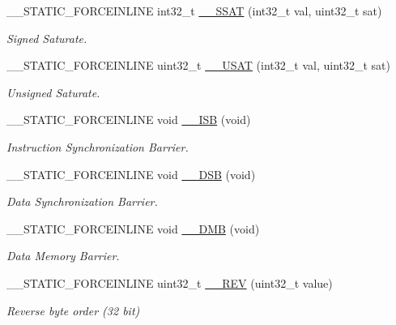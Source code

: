 \begin{DoxyCompactItemize}
\+\_\+\+\_\+\+S\+T\+A\+T\+I\+C\+\_\+\+F\+O\+R\+C\+E\+I\+N\+L\+I\+NE int32\+\_\+t \hyperlink{group___c_m_s_i_s___core___instruction_interface_ga372c0535573dde3e37f0f08c774a3487}{\+\_\+\+\_\+\+S\+S\+AT} (int32\+\_\+t val, uint32\+\_\+t sat)
\begin{DoxyCompactList}\small\item\em Signed Saturate. \end{DoxyCompactList}\item 
\+\_\+\+\_\+\+S\+T\+A\+T\+I\+C\+\_\+\+F\+O\+R\+C\+E\+I\+N\+L\+I\+NE uint32\+\_\+t \hyperlink{group___c_m_s_i_s___core___instruction_interface_ga6562dbd8182d1571e22dbca7ebdfa9bc}{\+\_\+\+\_\+\+U\+S\+AT} (int32\+\_\+t val, uint32\+\_\+t sat)
\begin{DoxyCompactList}\small\item\em Unsigned Saturate. \end{DoxyCompactList}\item 
\+\_\+\+\_\+\+S\+T\+A\+T\+I\+C\+\_\+\+F\+O\+R\+C\+E\+I\+N\+L\+I\+NE void \hyperlink{group___c_m_s_i_s___core___instruction_interface_gae26c2b3961e702aeabc24d4984ebd369}{\+\_\+\+\_\+\+I\+SB} (void)
\begin{DoxyCompactList}\small\item\em Instruction Synchronization Barrier. \end{DoxyCompactList}\item 
\+\_\+\+\_\+\+S\+T\+A\+T\+I\+C\+\_\+\+F\+O\+R\+C\+E\+I\+N\+L\+I\+NE void \hyperlink{group___c_m_s_i_s___core___instruction_interface_ga7fe277f5385d23b9c44b2cbda1577ce9}{\+\_\+\+\_\+\+D\+SB} (void)
\begin{DoxyCompactList}\small\item\em Data Synchronization Barrier. \end{DoxyCompactList}\item 
\+\_\+\+\_\+\+S\+T\+A\+T\+I\+C\+\_\+\+F\+O\+R\+C\+E\+I\+N\+L\+I\+NE void \hyperlink{group___c_m_s_i_s___core___instruction_interface_gab1ea24daaaaee9c828f90cbca330cb5e}{\+\_\+\+\_\+\+D\+MB} (void)
\begin{DoxyCompactList}\small\item\em Data Memory Barrier. \end{DoxyCompactList}\item 
\+\_\+\+\_\+\+S\+T\+A\+T\+I\+C\+\_\+\+F\+O\+R\+C\+E\+I\+N\+L\+I\+NE uint32\+\_\+t \hyperlink{group___c_m_s_i_s___core___instruction_interface_gadb92679719950635fba8b1b954072695}{\+\_\+\+\_\+\+R\+EV} (uint32\+\_\+t value)
\begin{DoxyCompactList}\small\item\em Reverse byte order (32 bit) \end{DoxyCompactList}\item 

\end{DoxyCompactItemize}

